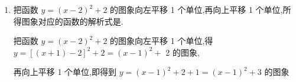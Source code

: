 \begin{enumerate}
\begin{jieda}
        可得 $y = x + \left| x\right|  + 1 = x - 1 + \left| {x - 1}\right|  + 1 = x + \left| {x - 1}\right|$ .
    \end{jieda}
    \item 把函数 $y = {\left( x - 2\right) }^{2} + 2$ 的图象向左平移 1 个单位,再向上平移 1 个单位,所得图象对应的函数的解析式是.
    \begin{jieda}
        把函数 $y = {\left( x - 2\right) }^{2} + 2$ 的图象向左平移 1 个单位,得 $y = {\left\lbrack  \left( x + 1\right)  - 2\right\rbrack  }^{2} + 2 = {\left( x - 1\right) }^{2} +$ 2 的图象,

        再向上平移 1 个单位,即得到 $y = {\left( x - 1\right) }^{2} + 2 + 1 = {\left( x - 1\right) }^{2} + 3$ 的图象
    \end{jieda}
\end{enumerate}


